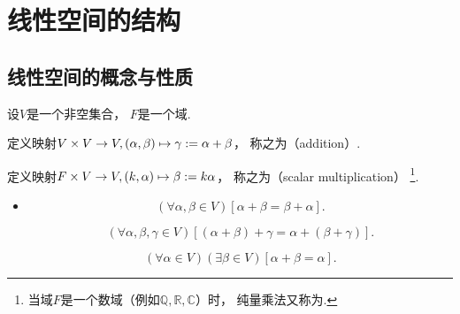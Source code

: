 \section{线性空间的结构}
\subsection{线性空间的概念与性质}
\begin{definition}\label{definition:线性空间.线性空间的结构.线性空间的定义}
设\(V\)是一个非空集合，
\(F\)是一个域.

定义映射\(
	V \times V \to V,
	(\alpha,\beta)
	\mapsto
	\gamma := \alpha + \beta
\)，
称之为（addition）.

定义映射\(
	F \times V \to V,
	(k,\alpha)
	\mapsto
	\beta := k \alpha
\)，
称之为（scalar multiplication）
\footnote{
	当域\(F\)是一个数域（例如\(\mathbb{Q},\mathbb{R},\mathbb{C}\)）时，
	纯量乘法又称为.
}.

\begingroup
\let\labelitemi\relax
\begin{itemize}
		\item
		\vspace{-1.2cm}
		\begin{axiom}[加法交换律]\label{definition:线性空间.运算法则1}
			\begin{equation*}
				(\forall\alpha,\beta\in V)
				[
					\alpha + \beta = \beta + \alpha
				].
			\end{equation*}
		\end{axiom}
		\begin{axiom}[加法结合律]\label{definition:线性空间.运算法则2}
			\begin{equation*}
				(\forall\alpha,\beta,\gamma\in V)
				[
					(\alpha + \beta) + \gamma
					= \alpha + (\beta + \gamma)
				].
			\end{equation*}
		\end{axiom}
		\begin{axiom}[零元的存在性]\label{definition:线性空间.运算法则3}
			\begin{equation*}
				(\forall \alpha \in V)
				(\exists \beta \in V)
				[
					\alpha + \beta = \alpha
				].
			\end{equation*}


\end{axiom}
\end{itemize}
\end{definition}
